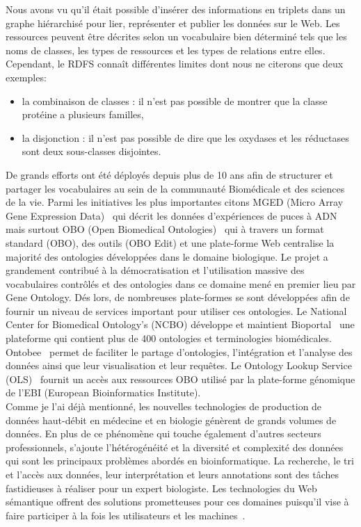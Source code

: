 Nous avons vu qu’il était possible d’insérer des informations en triplets dans un graphe hiérarchisé pour lier, représenter et publier les données sur le Web. Les ressources peuvent être décrites selon un vocabulaire bien déterminé tels que les noms de classes, les types de ressources et les types de relations entre elles. Cependant, le RDFS connaît différentes limites dont nous ne citerons que deux exemples:\\
\begin{itemize}
\item la combinaison de classes : il n’est pas possible de montrer que la classe protéine a plusieurs familles,
\item la disjonction : il n’est pas possible de dire que les oxydases et les réductases sont deux sous-classes disjointes.\\
\end{itemize}

De grands efforts ont été déployés depuis plus de 10 ans afin de structurer et partager les vocabulaires au sein de la communauté Biomédicale et des sciences de la vie. Parmi les initiatives les plus importantes citons MGED (Micro Array Gene Expression Data)~\cite{Whetzel2006} qui décrit les données d’expériences de puces à ADN mais surtout OBO (Open Biomedical Ontologies)~\cite{Smith2007,Golbreich2007,Tirmizi2011} qui à travers un format standard (OBO), des outils (OBO Edit) et une plate-forme Web centralise la majorité des ontologies développées dans le domaine biologique. Le projet a grandement contribué à la démocratisation et l'utilisation massive des vocabulaires contrôlés et des ontologies dans ce domaine mené en premier lieu par Gene Ontology. Dés lors, de nombreuses plate-formes se sont développées afin de fournir un niveau de services important pour utiliser ces ontologies.  Le National Center for Biomedical Ontology’s (NCBO) développe et maintient Bioportal~\cite{Noy2009} une plateforme qui contient plus de 400 ontologies et terminologies biomédicales. Ontobee~\cite{Ong2016} permet de faciliter le partage d’ontologies, l’intégration et l’analyse des données ainsi que leur visualisation et leur requêtes. Le Ontology Lookup Service (OLS)~\cite{Cote2006} fournit un accès aux ressources OBO utilisé par la plate-forme génomique de l'EBI (European Bioinformatics Institute).\\

Comme je l'ai déjà mentionné, les nouvelles technologies de production de données haut-débit en médecine et en biologie génèrent de grands volumes de données. En plus de ce phénomène qui touche également d'autres secteurs professionnels, s'ajoute l’hétérogénéité et la diversité et complexité des données qui sont les principaux problèmes abordés en bioinformatique. La recherche, le tri et l’accès aux données, leur interprétation et leurs annotations sont des tâches fastidieuses à réaliser pour un expert biologiste.  Les technologies du Web sémantique offrent des solutions prometteuses pour ces domaines puisqu'il vise à faire participer à la fois les utilisateurs et les machines~\cite{berners2001semweb}.\\

